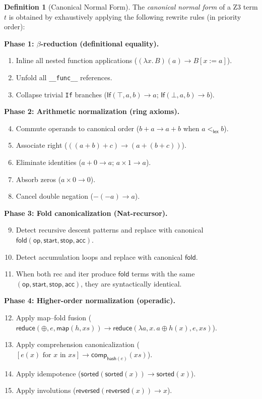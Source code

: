 \documentclass[11pt,a4paper]{report}
\theoremstyle{definition}
\newtheorem{definition}{Definition}[chapter]
\theoremstyle{plain}
\newcommand{\fold}{\mathsf{fold}}
\newcommand{\op}{\mathsf{op}}
\begin{document}
\begin{definition}[Canonical Normal Form]
\label{def:cnf}
The \emph{canonical normal form} of a Z3 term $t$ is obtained by
exhaustively applying the following rewrite rules (in priority order):

\textbf{Phase 1: $\beta$-reduction (definitional equality).}
\begin{enumerate}
  \item Inline all nested function applications
    ($(\lambda x.\, B)(a) \to B[x := a]$).
  \item Unfold all \texttt{\_\_func\_\_} references.
  \item Collapse trivial \texttt{If} branches
    ($\mathsf{If}(\top, a, b) \to a$; $\mathsf{If}(\bot, a, b) \to b$).
\end{enumerate}

\textbf{Phase 2: Arithmetic normalization (ring axioms).}
\begin{enumerate}
  \setcounter{enumi}{3}
  \item Commute operands to canonical order
    ($b + a \to a + b$ when $a <_\mathsf{lex} b$).
  \item Associate right ($((a+b)+c) \to (a+(b+c))$).
  \item Eliminate identities ($a + 0 \to a$; $a \times 1 \to a$).
  \item Absorb zeros ($a \times 0 \to 0$).
  \item Cancel double negation ($-(-a) \to a$).
\end{enumerate}

\textbf{Phase 3: Fold canonicalization (Nat-recursor).}
\begin{enumerate}
  \setcounter{enumi}{8}
  \item Detect recursive descent patterns and replace with
    canonical $\fold(\op, \mathsf{start}, \mathsf{stop}, \mathsf{acc})$.
  \item Detect accumulation loops and replace with canonical $\fold$.
  \item When both rec and iter produce $\fold$ terms with the same
    $(\op, \mathsf{start}, \mathsf{stop}, \mathsf{acc})$, they
    are syntactically identical.
\end{enumerate}

\textbf{Phase 4: Higher-order normalization (operadic).}
\begin{enumerate}
  \setcounter{enumi}{11}
  \item Apply map--fold fusion
    ($\mathsf{reduce}(\oplus, e, \mathsf{map}(h, xs)) \to
    \mathsf{reduce}(\lambda a,x.\, a \oplus h(x), e, xs)$).
  \item Apply comprehension canonicalization
    ($[e(x) \text{ for } x \text{ in } xs] \to
    \mathsf{comp}_{\mathsf{hash}(e)}(xs)$).
  \item Apply idempotence ($\mathsf{sorted}(\mathsf{sorted}(x)) \to
    \mathsf{sorted}(x)$).
  \item Apply involutions ($\mathsf{reversed}(\mathsf{reversed}(x))
    \to x$).
\end{enumerate}


\end{definition}
\end{document}

